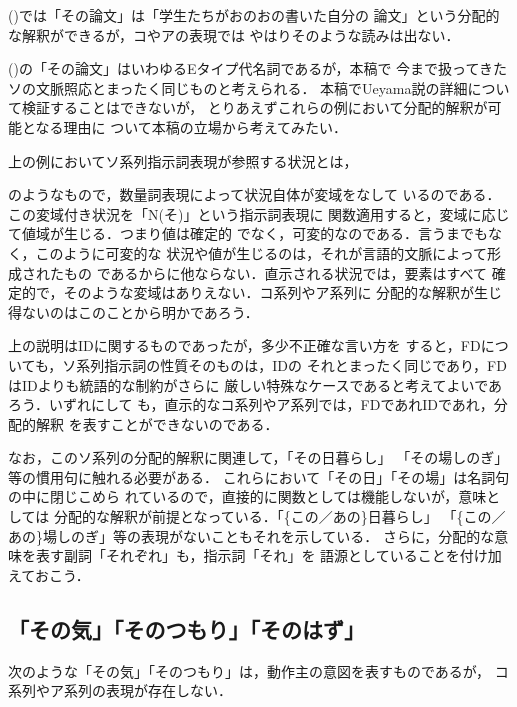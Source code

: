 
()では「その論文」は「学生たちがおのおの書いた自分の
論文」という分配的な解釈ができるが，コやアの表現では
やはりそのような読みは出ない．


()の「その論文」はいわゆるEタイプ代名詞であるが，本稿で
今まで扱ってきたソの文脈照応とまったく同じものと考えられる．
本稿でUeyama説の詳細について検証することはできないが，
とりあえずこれらの例において分配的解釈が可能となる理由に
ついて本稿の立場から考えてみたい．

上の例においてソ系列指示詞表現が参照する状況とは，

のようなもので，数量詞表現によって状況自体が変域をなして
いるのである．この変域付き状況を「N(そ)」という指示詞表現に
関数適用すると，変域に応じて値域が生じる．つまり値は確定的
でなく，可変的なのである．言うまでもなく，このように可変的な
状況や値が生じるのは，それが言語的文脈によって形成されたもの
であるからに他ならない．直示される状況では，要素はすべて
確定的で，そのような変域はありえない．コ系列やア系列に
分配的な解釈が生じ得ないのはこのことから明かであろう．

上の説明はIDに関するものであったが，多少不正確な言い方を
すると，FDについても，ソ系列指示詞の性質そのものは，IDの
それとまったく同じであり，FDはIDよりも統語的な制約がさらに
厳しい特殊なケースであると考えてよいであろう．いずれにして
も，直示的なコ系列やア系列では，FDであれIDであれ，分配的解釈
を表すことができないのである．

なお，このソ系列の分配的解釈に関連して，「その日暮らし」
「その場しのぎ」等の慣用句に触れる必要がある\cite{hoji91}．
これらにおいて「その日」「その場」は名詞句の中に閉じこめら
れているので，直接的に関数としては機能しないが，意味としては
分配的な解釈が前提となっている．「\{この／あの\}日暮らし」
「\{この／あの\}場しのぎ」等の表現がないこともそれを示している．
さらに，分配的な意味を表す副詞「それぞれ」も，指示詞「それ」を
語源としていることを付け加えておこう．

\subsection{「その気」「そのつもり」「そのはず」}
次のような「その気」「そのつもり」は，動作主の意図を表すものであるが，
コ系列やア系列の表現が存在しない．

